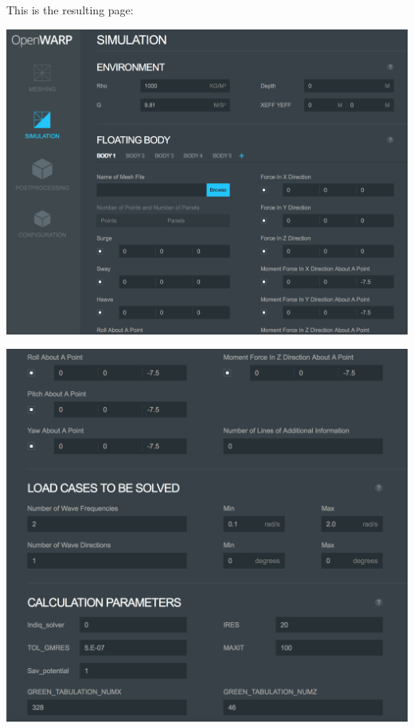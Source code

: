 \documentclass[12pt]{article}
\begin{document}
This is the resulting page:

\vspace{\abovedisplayskip}
\begin{minipage}{\linewidth}
	\centering
	\includegraphics[scale=0.4]{img/26}
\end{minipage}
\vspace{\belowdisplayskip}

\vspace{\abovedisplayskip}
\begin{minipage}{\linewidth}
	\centering
	\includegraphics[scale=0.4]{img/27}
\end{minipage}
\vspace{\belowdisplayskip}
\end{document}
